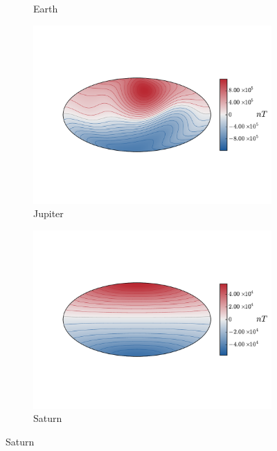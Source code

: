 \begin{figure}
\begin{subfigure}[b]{0.47\textwidth}
                \caption{Earth \citep{igrf11}}
                \label{fig:Earthbr}
        \end{subfigure}
        	\begin{subfigure}[b]{0.47\textwidth}
                \includegraphics[width=\textwidth]{Chapter1/Figures/Jupiter.pdf}
                \caption{Jupiter \citep{connerney1992}}
                \label{fig:Jupiterbr}
        \end{subfigure}
        	\begin{subfigure}[b]{0.47\textwidth}
                \includegraphics[width=\textwidth]{Chapter1/Figures/Saturn.pdf}
		\caption{Saturn \citep{cao2011}}
                \label{fig:Saturnbr}
        \end{subfigure}

\end{figure}
